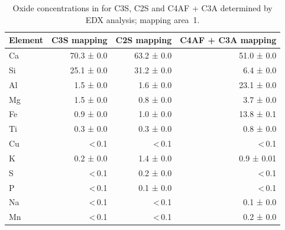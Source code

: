 \begin{table}[!htb]
	\caption{
		Oxide concentrations in \unit{\wtpercent} for \ac{C3S}, \ac{C2S} and \ac{C4AF} + \ac{C3A} determined by \ac{EDX} analysis; mapping area~1.
	}
	\label{tab:laicpms1-area1}
	\begin{tabular*}{\linewidth}{@{\extracolsep{\fill}} lrrr}
	\toprule
	Element  & \ac{C3S}   mapping  &\ac{C2S}   mapping  & \ac{C4AF} + \ac{C3A}  mapping \\ \midrule
	Ca & 70.3 ± 0.0	& 63.2 ± 0.0	& 51.0 ± 0.0 \\
	Si & 25.1 ± 0.0	& 31.2 ± 0.0	&  6.4 ± 0.0 \\
	Al &  1.5 ± 0.0	&  1.6 ± 0.0	& 23.1 ± 0.0 \\
	Mg &  1.5 ± 0.0	&  0.8 ± 0.0	&  3.7 ± 0.0 \\
	Fe &  0.9 ± 0.0	&  1.0 ± 0.0	& 13.8 ± 0.1 \\
	Ti &  0.3 ± 0.0	&  0.3 ± 0.0	&  0.8 ± 0.0 \\
	Cu & <\,0.1		& <\,0.1		& <\,0.1     \\
	K  &  0.2 ± 0.0	&  1.4 ± 0.0	& 0.9 ± 0.01 \\
	S  & <\,0.1		&  0.2 ± 0.0	& <\,0.1     \\
	P  & <\,0.1		&  0.1 ± 0.0	& <\,0.1     \\
	Na & <\,0.1		& <\,0.1		&  0.1 ± 0.0 \\
	Mn & <\,0.1		& <\,0.1		&  0.2 ± 0.0 \\ \bottomrule 
	\end{tabular*}
\end{table}

